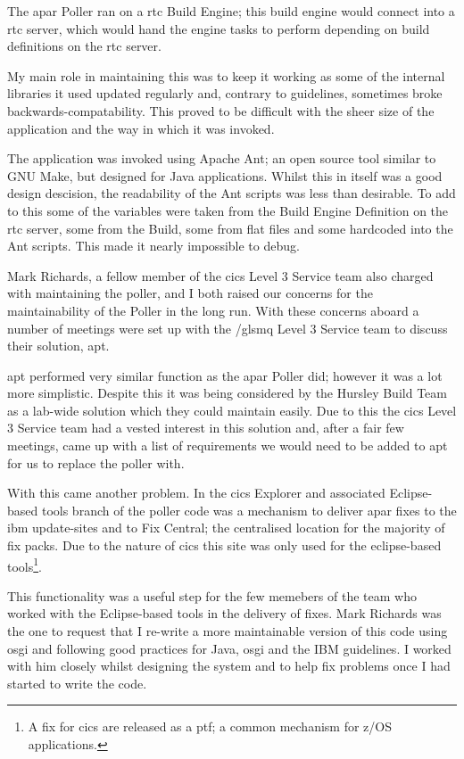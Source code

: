 \documentclass[a4paper,11pt]{report}
\begin{document}
The \gls{apar} Poller ran on a \gls{rtc} Build Engine; this build engine would connect into a 
\gls{rtc} server, which would hand the engine tasks to perform depending on build definitions on
the \gls{rtc} server.

My main role in maintaining this was to keep it working as some of the internal libraries it used
updated regularly and, contrary to guidelines, sometimes broke backwards-compatability. This 
proved to be difficult with the sheer size of the application and the way in which it was invoked.

The application was invoked using Apache Ant; an open source tool similar to GNU Make, but designed
for Java applications. Whilst this in itself was a good design descision, the readability of the 
Ant scripts was less than desirable. To add to this some of the variables were taken from the 
Build Engine Definition on the \gls{rtc} server, some from the Build, some from flat files and some
hardcoded into the Ant scripts. This made it nearly impossible to debug.

Mark Richards, a fellow member of the \gls{cics} Level 3 Service team also charged with maintaining
the poller, and I both raised our concerns for the maintainability of the Poller in the long run.
With these concerns aboard a number of meetings were set up with the /gls{mq} Level 3 Service team
to discuss their solution, \gls{apt}.

\gls{apt} performed very similar function as the \gls{apar} Poller did; however it was a lot more
simplistic. Despite this it was being considered by the Hursley Build Team as a lab-wide solution
which they could maintain easily. Due to this the \gls{cics} Level 3 Service team had a vested
interest in this solution and, after a fair few meetings, came up with a list of requirements we
would need to be added to \gls{apt} for us to replace the poller with.

With this came another problem. In the \gls{cics} Explorer and associated Eclipse-based tools 
branch of the poller code was a mechanism to deliver \gls{apar} fixes to the \gls{ibm} 
update-sites and to Fix Central; the centralised location for the majority of fix packs. Due to the
nature of \gls{cics} this site was only used for the eclipse-based tools\footnote{A fix for 
\gls{cics} are released as a \gls{ptf}; a common mechanism for z/OS applications.}.

This functionality was a useful step for the few memebers of the team who worked with the 
Eclipse-based tools in the delivery of fixes. Mark Richards was the one to request that I re-write
a more maintainable version of this code using \gls{osgi} and following good practices for Java,
\gls{osgi} and the IBM guidelines. I worked with him closely whilst designing the system and to 
help fix problems once I had started to write the code.
\end{document}

